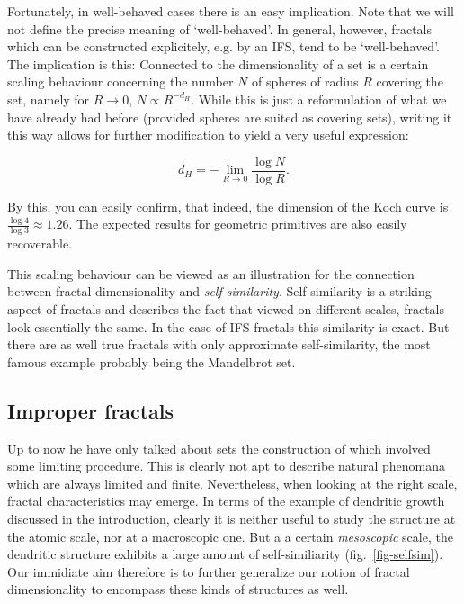 \documentclass[twocolumn,10pt]{scrartcl}
\begin{document}
            Fortunately, in well-behaved cases there is an easy implication. Note that we will not define the precise
            meaning of `well-behaved'. In general, however, fractals which can be constructed explicitely, e.g. by
            an IFS, tend to be `well-behaved'. The implication is this: Connected to the dimensionality of a set
            is a certain scaling behaviour concerning the number $N$ of spheres of radius $R$ covering the set, namely
            for $R\rightarrow 0$, $N\propto R^{-d_H}$. While this is just a reformulation of what we have already had
            before (provided spheres are suited as covering sets), writing it this way allows for further modification
            to yield a very useful expression:

            \begin{equation}
                d_H=-\lim_{R\rightarrow 0}\frac{\log N}{\log R}.
                \label{eq-bcdimlim}
            \end{equation}

            By this, you can easily confirm, that indeed, the dimension of the Koch curve is
            $\frac{\log{4}}{\log{3}}\approx 1.26$. The expected results for geometric primitives are also easily
            recoverable.

            This scaling behaviour can be viewed as an illustration for the connection between fractal dimensionality
            and \emph{self-similarity}. Self-similarity is a striking aspect of fractals and describes the fact that
            viewed on different scales, fractals look essentially the same. In the case of IFS fractals this similarity
            is exact. But there are as well true fractals with only approximate self-similarity, the most famous
            example probably being the Mandelbrot set.

        \subsection{Improper fractals}
            Up to now he have only talked about sets the construction of which involved some limiting procedure. This
            is clearly not apt to describe natural phenomana which are always limited and finite. Nevertheless, when
            looking at the right scale, fractal characteristics may emerge. In terms of the example of dendritic growth
            discussed in the introduction, clearly it is neither useful to study the structure at the atomic scale,
            nor at a macroscopic one. But a a certain \emph{mesoscopic} scale, the dendritic structure exhibits a large
            amount of self-similiarity (fig.~\ref{fig-selfsim}). Our immidiate aim therefore is to further generalize
            our notion of fractal dimensionality to encompass these kinds of structures as well.
            
\end{document}
